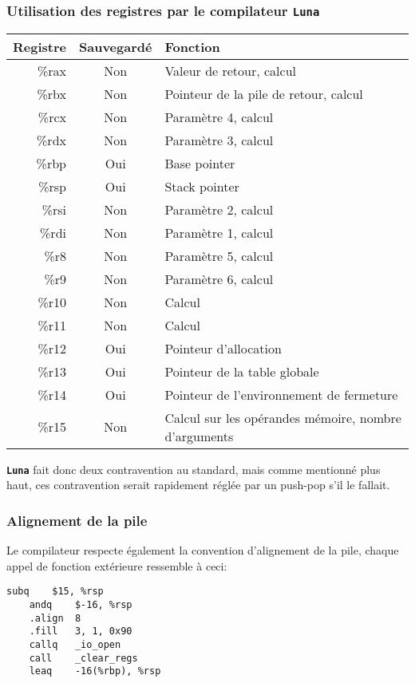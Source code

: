 \documentclass{article}
\newcommand{\luna}{\textbf{\texttt{Luna}}}
\newcommand{\R}[1]{\%{}{#1}}
\begin{document}
\subsubsection{Utilisation des registres par le compilateur \luna{}}
\begin{center}
  \begin{tabular}{r|c|p{12cm}}
    Registre & Sauvegardé & Fonction \\
    \hline
    \R{rax} & Non & Valeur de retour, calcul\\
    \R{rbx} & {\color{red}Non} & Pointeur de la pile de retour, calcul\\
    \R{rcx} & Non & Paramètre 4, calcul\\
    \R{rdx} & Non & Paramètre 3, calcul\\
    \R{rbp} & Oui & Base pointer\\
    \R{rsp} & Oui & Stack pointer\\
    \R{rsi} & Non & Paramètre 2, calcul\\
    \R{rdi} & Non & Paramètre 1, calcul\\
    \R{r8}  & Non & Paramètre 5, calcul\\
    \R{r9}  & Non & Paramètre 6, calcul\\
    \R{r10} & Non & Calcul\\
    \R{r11} & Non & Calcul\\
    \R{r12} & Oui & Pointeur d'allocation\\
    \R{r13} & Oui & Pointeur de la table globale\\
    \R{r14} & Oui & Pointeur de l'environnement de fermeture\\
    \R{r15} & {\color{red}Non} & Calcul sur les opérandes mémoire, nombre d'arguments\\
  \end{tabular}
\end{center}
\luna{} fait donc deux contravention au standard, mais comme mentionné plus haut, ces contravention serait rapidement réglée par un push-pop s'il le fallait.
\newpage
\subsubsection{Alignement de la pile}
Le compilateur respecte également la convention d'alignement de la pile, chaque appel de fonction extérieure ressemble à ceci:
\begin{center}
  \begin{lstlisting}[style=asm]
	subq	$15, %rsp
	andq	$-16, %rsp
	.align	8
	.fill	3, 1, 0x90
	callq	_io_open
	call	_clear_regs
	leaq	-16(%rbp), %rsp
  \end{lstlisting}
\end{center}
\end{document}
